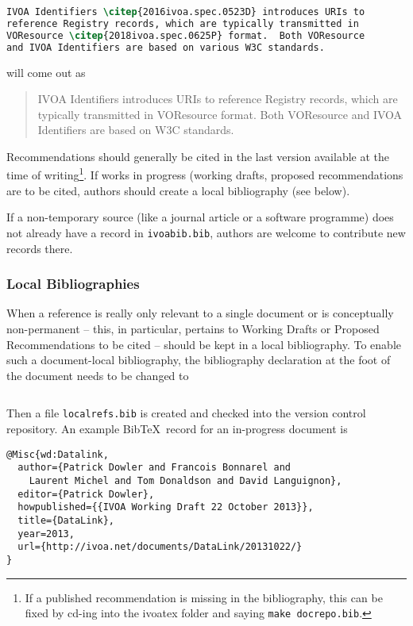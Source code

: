 \documentclass[11pt,a4paper]{ivoa}
\newcommand{\BibTeX}{BibTeX}
\begin{document}
\begin{lstlisting}[language=tex]
IVOA Identifiers \citep{2016ivoa.spec.0523D} introduces URIs to
reference Registry records, which are typically transmitted in
VOResource \citep{2018ivoa.spec.0625P} format.  Both VOResource 
and IVOA Identifiers are based on various W3C standards.
\end{lstlisting}

will come out as

\begin{quotation}
IVOA Identifiers \citep{2016ivoa.spec.0523D} introduces URIs to
reference Registry records, which are typically transmitted in
VOResource \citep{2018ivoa.spec.0625P} format.  Both VOResource and IVOA
Identifiers are based on W3C standards.
\end{quotation}

Recommendations should generally be cited in the last version available
at the time of writing\footnote{If a published recommendation is missing
in the bibliography, this can be fixed by cd-ing into the ivoatex folder
and saying \texttt{make docrepo.bib}.}.  If works in progress (working
drafts, proposed recommendations are to be cited, authors should create
a local bibliography (see below).

If a non-temporary source (like a journal article or a software
programme) does not already have a record in \texttt{ivoabib.bib},
authors are welcome to contribute new records there.

\subsubsection{Local Bibliographies}

When a reference is really only relevant to a single document or is
conceptually non-permanent -- this, in particular, pertains to Working
Drafts or Proposed Recommendations to be cited -- should be kept in a
local bibliography.  To enable such a document-local bibliography,
the bibliography declaration at the foot of the document needs to be
changed to

\begin{lstlisting}[language=tex]

\end{lstlisting}

Then a file \texttt{localrefs.bib} is created and checked into the
version control repository.  An example \BibTeX\ record for an
in-progress document is

\begin{lstlisting}
@Misc{wd:Datalink,
  author={Patrick Dowler and Francois Bonnarel and 
    Laurent Michel and Tom Donaldson and David Languignon},
  editor={Patrick Dowler},
  howpublished={{IVOA Working Draft 22 October 2013}},
  title={DataLink},
  year=2013,
  url={http://ivoa.net/documents/DataLink/20131022/}
}
\end{lstlisting}
\end{document}
